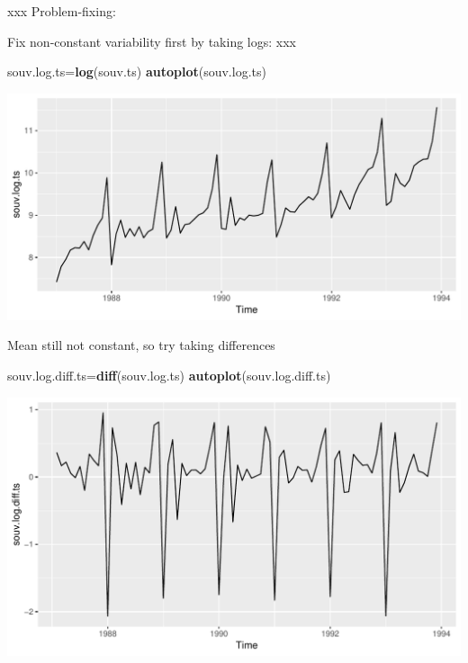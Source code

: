 \documentclass[ignorenonframetext,]{beamer}
\newenvironment{Shaded}{\begin{snugshade}}{\end{snugshade}}
\newcommand{\KeywordTok}[1]{\textcolor[rgb]{0.13,0.29,0.53}{\textbf{#1}}}
\newcommand{\NormalTok}[1]{#1}
\begin{document}
\begin{frame}[fragile]{xxx Problem-fixing:}
\protect\hypertarget{xxx-problem-fixing}{}

Fix non-constant variability first by taking logs: xxx

\begin{Shaded}
\begin{Highlighting}[]
\NormalTok{souv.log.ts=}\KeywordTok{log}\NormalTok{(souv.ts)}
\KeywordTok{autoplot}\NormalTok{(souv.log.ts)}
\end{Highlighting}
\end{Shaded}

\includegraphics{figure/unnamed-chunk-35-1.pdf}

\end{frame}

\begin{frame}[fragile]{Mean still not constant, so try taking
differences}
\protect\hypertarget{mean-still-not-constant-so-try-taking-differences}{}

\begin{Shaded}
\begin{Highlighting}[]
\NormalTok{souv.log.diff.ts=}\KeywordTok{diff}\NormalTok{(souv.log.ts)}
\KeywordTok{autoplot}\NormalTok{(souv.log.diff.ts)}
\end{Highlighting}
\end{Shaded}

\includegraphics{figure/unnamed-chunk-36-1.pdf}

\end{frame}
\end{document}
